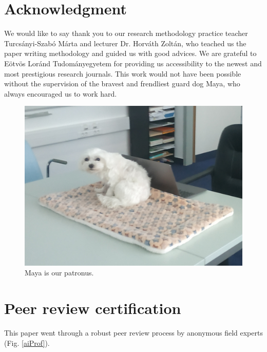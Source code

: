 \documentclass[conference]{IEEEtran}
\begin{document}
\section*{Acknowledgment}

We would like to say thank you to our research methodology practice teacher Turcsányi-Szabó Márta and lecturer Dr. Horváth Zoltán, who teached us the paper writing methodology and guided us with good advices.
We are grateful to Eötvös Loránd Tudományegyetem for providing us accessibility to the newest and most prestigious research journals.
This work would not have been possible without the supervision of the bravest and frendliest guard dog Maya, who always encouraged us to work hard.

\begin{figure}[htbp]
    \begin{center}
    \includegraphics[scale=0.16]{IMG_20221019_165459.jpg}
    \end{center}
    \caption{Maya is our patronus.}
\end{figure}


\section*{Peer review certification}
This paper went through a robust peer review process by anonymous field experts (Fig. \ref{aiProf}).
\end{document}
